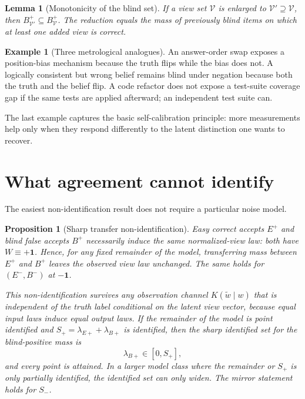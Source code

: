 \documentclass[11pt]{article}
\newtheorem{proposition}[theorem]{Proposition}
\newtheorem{lemma}[theorem]{Lemma}
\theoremstyle{definition}
\newtheorem{example}[theorem]{Example}
\theoremstyle{remark}
\newcommand{\one}{\mathbf{1}}
\newcommand{\cV}{\mathcal{V}}
\begin{document}
\begin{lemma}[Monotonicity of the blind set]
If a view set $\cV$ is enlarged to $\cV'\supseteq\cV$, then $B^+_{\cV'}\subseteq B^+_{\cV}$. The reduction equals the mass of previously blind items on which at least one added view is correct.
\end{lemma}

\begin{example}[Three metrological analogues]
An answer-order swap exposes a position-bias mechanism because the truth flips while the bias does not. A logically consistent but wrong belief remains blind under negation because both the truth and the belief flip. A code refactor does not expose a test-suite coverage gap if the same tests are applied afterward; an independent test suite can.
\end{example}

The last example captures the basic self-calibration principle: more measurements help only when they respond differently to the latent distinction one wants to recover.

\section{What agreement cannot identify}
\label{sec:blind}

The easiest non-identification result does not require a particular noise model.

\begin{proposition}[Sharp transfer non-identification]
\label{prop:transfer}
Easy correct accepts $E^+$ and blind false accepts $B^+$ necessarily induce the same normalized-view law: both have $W\equiv+\one$. Hence, for any fixed remainder of the model, transferring mass between $E^+$ and $B^+$ leaves the observed view law unchanged. The same holds for $(E^-,B^-)$ at $-\one$.

This non-identification survives any observation channel $K(\widetilde w\mid w)$ that is independent of the truth label conditional on the latent view vector, because equal input laws induce equal output laws. If the remainder of the model is point identified and $S_+=\lambda_{E+}+\lambda_{B+}$ is identified, then the sharp identified set for the blind-positive mass is
\[
\lambda_{B+}\in[0,S_+],
\]
and every point is attained. In a larger model class where the remainder or $S_+$ is only partially identified, the identified set can only widen. The mirror statement holds for $S_-$.
\end{proposition}
\end{document}
